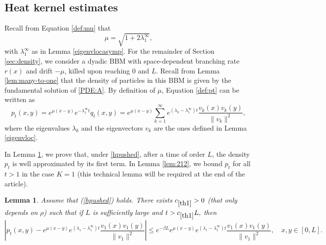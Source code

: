 \documentclass[11pt]{article}
\theoremstyle{plain}
\newtheorem{lemma}{Lemma}[section]
\newcommand\linf{\lambda_1^\infty}
\begin{document}
\subsection{Heat kernel estimates} \label{sec:heatkernel}
Recall from Equation \eqref{def:mu} that  
\begin{equation*}
\mu=\sqrt{1+2\linf},
\end{equation*}
with $\linf$ as in  Lemma \ref{eigenvlocasymp}. For the remainder of Section \ref{sec:density}, we consider a dyadic BBM with space-dependent branching rate $r(x)$ and drift $-\mu$, killed upon reaching $0$ and $L$. 
Recall from Lemma \ref{lem:many-to-one} that the density of particles in this BBM is given by the fundamental solution of \eqref{PDE:A}. By definition of $\mu$, Equation \eqref{def:pt} can be written as
\begin{equation}
p_t(x,y)=e^{\mu (x-y)}e^{-\linf t} q_t(x,y)= e^{\mu (x-y)}\sum_{k=1}^\infty e^{(\lambda_k-\linf)t}\frac{v_k(x)v_k(y)}{\|v_k\|^2}, \label{def:pt1}
\end{equation}
where the eigenvalues $\lambda_k$ and the eigenvectors $v_k$ are the ones defined in Lemma \ref{eigenvloc}. 

In Lemma \ref{th1}, we prove that, under \eqref{hpushed}, after a time of order $L$, the density $p_t$ is well approximated by its first term. In Lemma \ref{lem:212}, we bound $p_t$ for all $t>1$ in the case $K=1$ (this technical lemma will be required at the end of the article).

\begin{lemma}\label{th1} Assume that (\ref{hpushed}) holds. There exists $c_{\ref{th1}}>0$ (that only depends on $\rho$) such that if $L$ is sufficiently large and $t>c_{\ref{th1}} L,$ then
\begin{equation}
 \left|p_t(x,y)-e^{\mu(x-y)}e^{(\lambda_1-\linf)t}\frac{v_1(x)v_1(y)}{\|v_1\|^2}\right|\leqslant e^{-\beta L}e^{\mu(x-y)}e^{(\lambda_1-\linf)t}\frac{v_1(x)v_1(y)}{\|v_1\|^2}, \quad x,y\in[0,L]. \label{rem:asymptM}
\end{equation} 
\end{lemma}
 
\end{document}
